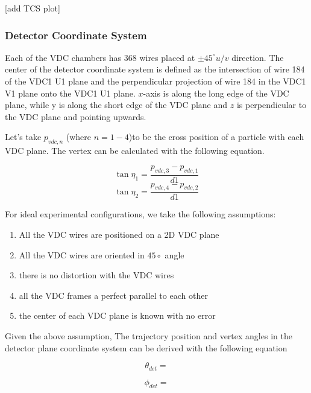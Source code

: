 [add TCS plot]


\subsubsection{Detector Coordinate System}

Each of the VDC chambers has 368 wires placed at $\pm 45 ^{\circ} u/v$ direction. The center of the detector coordinate system is defined as the intersection of wire 184 of the VDC1 U1 plane and the perpendicular projection of wire 184 in the VDC1 V1 plane onto the VDC1 U1 plane. $x$-axis is along the long edge of the VDC plane, while y is along the short edge of the VDC plane and $z$ is perpendicular to the VDC plane and pointing upwards. 

Let's take $p_{vdc,n}$ (where ${n=1-4}$)to be the cross position of a particle with each VDC plane. The vertex can be calculated with the following equation. 

\begin{equation}
    \tan \eta_{1} = \frac{p_{vdc,3} - p_{vdc, 1}}{d1}    
\end{equation}
\begin{equation}
    \tan \eta_{2} = \frac{p_{vdc,4} - p_{vdc, 2}}{d1}    
\end{equation}

For ideal experimental configurations, we take the following assumptions:
\begin{enumerate}
    \item All the VDC wires are positioned on a 2D VDC plane
    \item All the VDC wires are oriented in $45\circ$ angle
    \item there is no distortion with the VDC wires
    \item all the VDC frames a perfect parallel to each other 
    \item the center of each VDC plane is known with no error
\end{enumerate}

Given the above assumption, The trajectory position and vertex angles in the detector plane coordinate system can be derived with the following equation 

\begin{equation}
    \theta_{det} = 
\end{equation}
    
\begin{equation}
    \phi_{det} = 
\end{equation}

